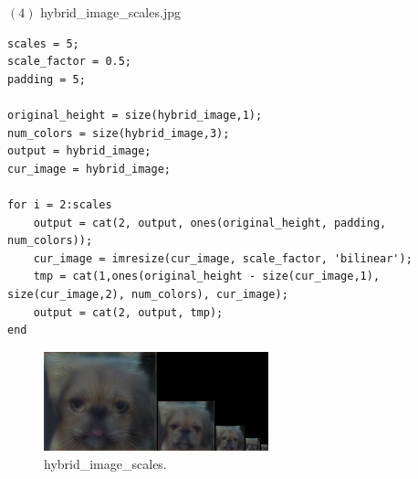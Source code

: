 $(4)$ hybrid\_image\_scales.jpg
\begin{lstlisting}[style=Matlab-editor]
scales = 5; 
scale_factor = 0.5; 
padding = 5; 

original_height = size(hybrid_image,1);
num_colors = size(hybrid_image,3); 
output = hybrid_image;
cur_image = hybrid_image;

for i = 2:scales
    output = cat(2, output, ones(original_height, padding, num_colors));
    cur_image = imresize(cur_image, scale_factor, 'bilinear');
    tmp = cat(1,ones(original_height - size(cur_image,1), size(cur_image,2), num_colors), cur_image);
    output = cat(2, output, tmp);    
end
\end{lstlisting}
\begin{figure}[!h]
    \centering
    \includegraphics[width=6.5cm]{hybrid_image_scales.jpg}
    \caption{hybrid\_image\_scales.}
    \label{fig:result4}
\end{figure}


